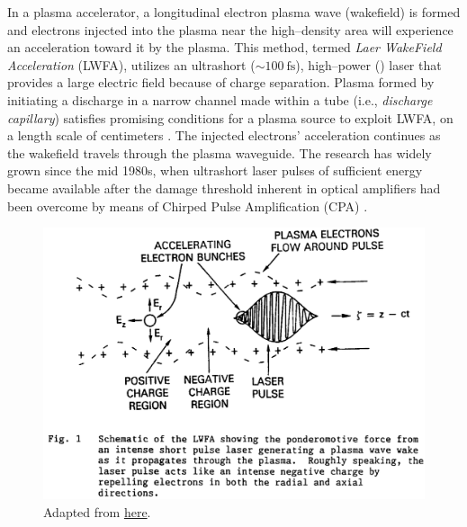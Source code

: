 \documentclass[../main.tex]{subfiles}
\begin{document}
In a plasma accelerator, a longitudinal electron plasma wave (wakefield) is formed and electrons injected into the plasma near the high--density area will experience an acceleration toward it by the plasma. This method, termed \emph{Laer WakeField Acceleration} (LWFA), utilizes an ultrashort ($\sim\SI{100}{\fs}$), high--power (\si{\TW}) laser that provides a large electric field because of charge separation. Plasma formed by initiating a discharge in a narrow channel made within a tube (i.e., \textit{discharge capillary}) satisfies promising conditions for a plasma source to exploit LWFA, on a length scale of centimeters \cite{Gonsalves2019PetawattWaveguide,Leemans2014Multi-GeVRegime}. The injected electrons' acceleration continues as the wakefield travels through the plasma waveguide. The research has widely grown since the mid 1980s, when ultrashort laser pulses of sufficient energy became available after the damage threshold inherent in optical amplifiers had been overcome by means of Chirped Pulse Amplification (CPA) \cite{Strickland1985CompressionPulses}.
\begin{figure}
    \centering
    \includegraphics[width=\textwidth]{figures/lwfa_schematic.PNG}
    \caption{Adapted from \href{https://aip.scitation.org/doi/pdf/10.1063/1.37621}{here}.}
    \label{fig:lwfa-schema}
\end{figure}

\end{document}
